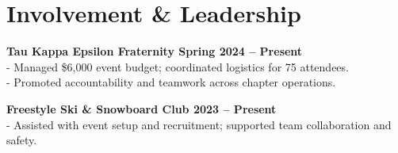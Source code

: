\documentclass[11pt, letterpaper]{article}
\begin{document}
\section*{Involvement \& Leadership}
\textbf{Tau Kappa Epsilon Fraternity \hfill Spring 2024 – Present} \\
- Managed \$6,000 event budget; coordinated logistics for 75 attendees. \\
- Promoted accountability and teamwork across chapter operations.

\textbf{Freestyle Ski \& Snowboard Club \hfill 2023 – Present} \\
- Assisted with event setup and recruitment; supported team collaboration and safety.
\end{document}

